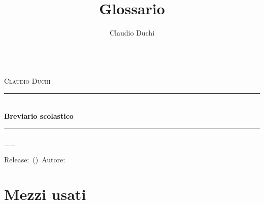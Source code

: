 \documentclass[a4paper,oneside]{book}%
\title{Glossario}
\author{Claudio Duchi}
\date{\datetime}
\makeatletter
\newcommand{\HRule}{\rule{\linewidth}{0.5mm}}
\renewcommand\frontmatter{%
	\cleardoublepage
	\@mainmatterfalse
}
\renewcommand\mainmatter{%
	\cleardoublepage
	\@mainmattertrue
}
\renewcommand\frontmatter{%
	\cleardoublepage
	\@mainmatterfalse
	\pagenumbering{arabic}}
\renewcommand\mainmatter{%
	\cleardoublepage
	\@mainmattertrue}
\makeatother
\begin{document}
	
		\hypersetup{pageanchor=false}
		\begin{titlepage}\parindent=0pt
			\centering
	\begin{center}
	\Lgrandedue\\[1cm]
	\textsc{\LARGE Claudio Duchi}\\[1.2cm]
	\HRule \\[0.4cm]
	{ \huge \bfseries Breviario scolastico}\\[0.4cm]
	\HRule \\[1.2cm]
	\vfill
	{\large $-$\DTMnow$-$}	
\end{center}
{\centering
	Release:\gitReln\ (\gitAbbrevHash)\ Autore:\gitAuthorName\ 
	\gitCommitterDate \\
}
		\end{titlepage}
		\CDcopyright
		\tableofcontents
\cleardoublepage
\glsaddall	
\printglossaries
\nocite{*}
\printbibliography
\appendix
\chapter{Mezzi usati}
\CDMezziUsati
\end{document}
